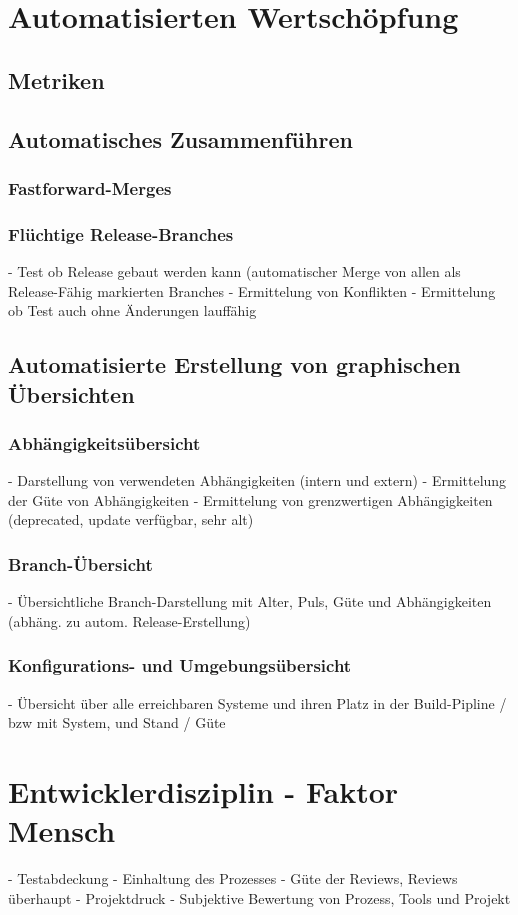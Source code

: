 \section{Automatisierten Wertschöpfung}
\subsection{Metriken}
\label{subsec:auto-values-metrics}
\subsection{Automatisches Zusammenführen}
\subsubsection{Fastforward-Merges}
\subsubsection{Flüchtige Release-Branches}
- Test ob Release gebaut werden kann (automatischer Merge von allen als Release-Fähig markierten Branches
- Ermittelung von Konflikten
- Ermittelung ob Test auch ohne Änderungen lauffähig
\subsection{Automatisierte Erstellung von graphischen Übersichten}
\subsubsection{Abhängigkeitsübersicht}
- Darstellung von verwendeten Abhängigkeiten (intern und extern)
- Ermittelung der Güte von Abhängigkeiten
- Ermittelung von grenzwertigen Abhängigkeiten (deprecated, update verfügbar, sehr alt)
\subsubsection{Branch-Übersicht}
- Übersichtliche Branch-Darstellung mit Alter, Puls, Güte und Abhängigkeiten (abhäng. zu autom. Release-Erstellung)
\subsubsection{Konfigurations- und Umgebungsübersicht}
- Übersicht über alle erreichbaren Systeme und ihren Platz in der Build-Pipline / bzw mit System, und Stand / Güte
\section{Entwicklerdisziplin - Faktor Mensch}
\label{sec:human-fail}
- Testabdeckung
- Einhaltung des Prozesses
- Güte der Reviews, Reviews überhaupt
- Projektdruck
- Subjektive Bewertung von Prozess, Tools und Projekt

